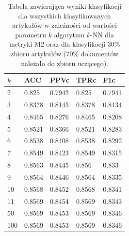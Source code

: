 \documentclass{classrep}
\begin{document}
\begin{table}[H]
    \centering
\caption{Tabela zawierająca wyniki klasyfikacji dla wszystkich klasyfikowanych artykułów w zależności od wartości parametru $k$ algorytmu $k$-NN dla metryki M2 oraz dla klasyfikacji 30\% zbioru artykułów (70\% dokumentów należało do zbioru uczącego).}
\begin{adjustbox}{max width=\textwidth}
    \begin{tabular}{|l|l|l|l|l|}
    \hline
        \(k\) & ACC & PPVc & TPRc & F1c \\ \hline
        2 & 0.825 & 0.7942 & 0.825 & 0.7941 \\ \hline
        3 & 0.8378 & 0.8145 & 0.8378 & 0.8134 \\ \hline
        4 & 0.8465 & 0.8276 & 0.8465 & 0.8208 \\ \hline
        5 & 0.8521 & 0.8366 & 0.8521 & 0.8283 \\ \hline
        6 & 0.8538 & 0.8408 & 0.8538 & 0.8292 \\ \hline
        7 & 0.8549 & 0.8423 & 0.8549 & 0.8315 \\ \hline
        8 & 0.8563 & 0.8445 & 0.856 & 0.833 \\ \hline
        9 & 0.8564 & 0.8446 & 0.8564 & 0.8335 \\ \hline
        10 & 0.8568 & 0.8452 & 0.8568 & 0.8341 \\ \hline
        11 & 0.8569 & 0.8454 & 0.8569 & 0.8343 \\ \hline
        50 & 0.8569 & 0.8453 & 0.8569 & 0.8346 \\ \hline
        100 & 0.8569 & 0.8453 & 0.8569 & 0.8346 \\ \hline
    \end{tabular}
\end{adjustbox}
\end{table}
\end{document}
